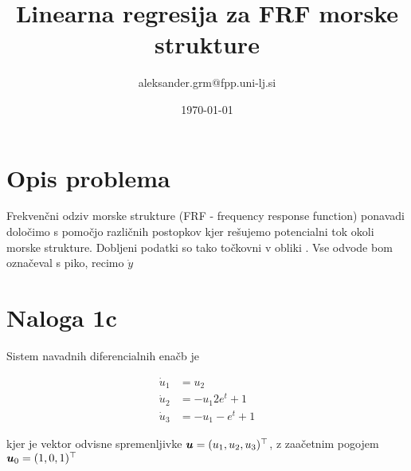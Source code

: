\documentclass[11pt]{article}
\title{Linearna regresija za FRF morske strukture}
\author{aleksander.grm@fpp.uni-lj.si}
\date{\today}
\theoremstyle{definition}
\begin{document}
\begin{spacing}{1.0}
\maketitle
{}
\end{spacing}

\vspace{2cm}

\section{Opis problema}
Frekvenčni odziv morske strukture (FRF - frequency response function) ponavadi določimo s pomočjo različnih postopkov kjer rešujemo potencialni tok okoli morske strukture. Dobljeni podatki so tako točkovni v obliki \cite{katsuhiko2010modern}. Vse odvode bom označeval s piko, recimo $\dot{y}$

\section{Naloga 1c}

Sistem navadnih diferencialnih enačb je

\begin{align}
	\dot{u}_1 & = u_2 \\
	\dot{u}_2 & = -u_1  2 e^t + 1 \\
	\dot{u}_3 & = -u_1 - e^t + 1
\end{align}

kjer je vektor odvisne spremenljivke ${\boldsymbol{{u}}} = (u_1,u_2,u_3)^\top$, z zaačetnim pogojem ${\boldsymbol{{u}}}_0 = (1,0,1)^\top$

\vspace{1cm}



\end{document}
